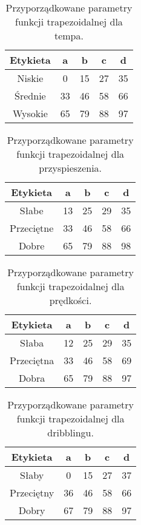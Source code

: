 \documentclass{classrep}
\begin{document}
\begin{table}[H]
	\centering
	\begin{tabular}{c c c c c} 
		\hline
		\textbf{Etykieta} & \textbf{a} & \textbf{b} & \textbf{c} &  \textbf{d} \\ [0.5ex] 
		\hline
		\hline 
		Niskie & 0 & 15 & 27 & 35 \\ 
		Średnie & 33 & 46 & 58 & 66 \\
		Wysokie & 65 & 79 & 88 & 97 \\
		\hline
	\end{tabular}
	\caption{Przyporządkowane parametry funkcji trapezoidalnej dla tempa.}
\end{table}

\begin{table}[H]
	\centering
	\begin{tabular}{c c c c c} 
		\hline
		\textbf{Etykieta} & \textbf{a} & \textbf{b} & \textbf{c} &  \textbf{d} \\ [0.5ex] 
		\hline
		\hline 
		Słabe & 13 & 25 & 29 & 35 \\ 
		Przeciętne & 33 & 46 & 58 & 66 \\
		Dobre & 65 & 79 & 88 & 98 \\
		\hline
	\end{tabular}
	\caption{Przyporządkowane parametry funkcji trapezoidalnej dla przyspieszenia.}
\end{table}

\begin{table}[H]
	\centering
	\begin{tabular}{c c c c c} 
		\hline
		\textbf{Etykieta} & \textbf{a} & \textbf{b} & \textbf{c} &  \textbf{d} \\ [0.5ex] 
		\hline
		\hline 
		Słaba & 12 & 25 & 29 & 35 \\ 
		Przeciętna & 33 & 46 & 58 & 69 \\
		Dobra & 65 & 79 & 88 & 97 \\
		\hline
	\end{tabular}
	\caption{Przyporządkowane parametry funkcji trapezoidalnej dla prędkości.}
\end{table}

\begin{table}[H]
	\centering
	\begin{tabular}{c c c c c} 
		\hline
		\textbf{Etykieta} & \textbf{a} & \textbf{b} & \textbf{c} &  \textbf{d} \\ [0.5ex] 
		\hline
		\hline 
		Słaby & 0 & 15 & 27 & 37 \\ 
		Przeciętny & 36 & 46 & 58 & 66 \\
		Dobry & 67 & 79 & 88 & 97 \\
		\hline
	\end{tabular}
	\caption{Przyporządkowane parametry funkcji trapezoidalnej dla dribblingu.}
\end{table}
\end{document}
